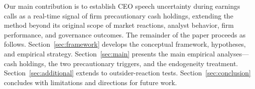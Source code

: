 Our main contribution is to establish CEO speech uncertainty during earnings calls as a real-time signal of firm precautionary cash holdings, extending the method beyond its original scope of market reactions, analyst behavior, firm performance, and governance outcomes. The remainder of the paper proceeds as follows. Section~\ref{sec:framework} develops the conceptual framework, hypotheses, and empirical strategy. Section~\ref{sec:main} presents the main empirical analyses---cash holdings, the two precautionary triggers, and the endogeneity treatment. Section~\ref{sec:additional} extends to outsider-reaction tests. Section~\ref{sec:conclusion} concludes with limitations and directions for future work.
